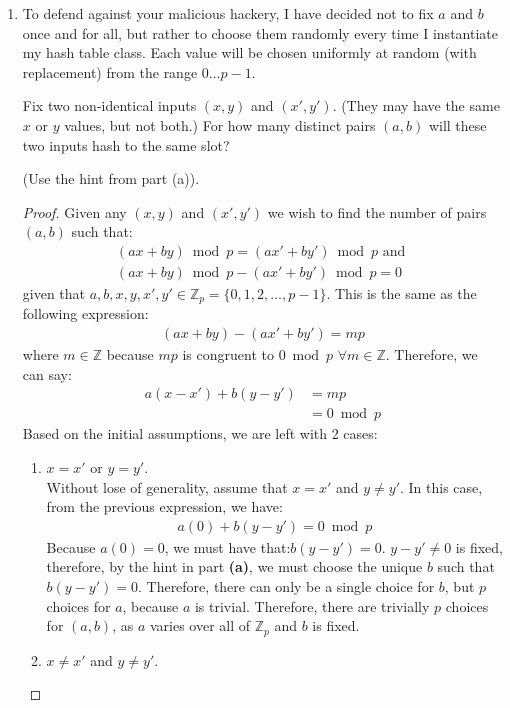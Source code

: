 \documentclass[11pt]{article}
\begin{document}
\begin{enumerate}
\begin{enumerate}
\item To defend against your malicious hackery, I have decided not to fix
$a$ and $b$ once and for all, but rather to choose them randomly every
time I instantiate my hash table class.  Each value will be chosen
uniformly at random (with replacement) from the range $0 \ldots p-1$.

Fix two non-identical inputs $(x,y)$ and $(x',y')$.  (They may have
the same $x$ or $y$ values, but not both.) For how many distinct pairs
$(a,b)$ will these two inputs hash to the same slot?

(Use the hint from part (a)).

\begin{proof}
Given any $(x,y)$ and $(x',y')$ we wish to find the number of pairs $(a,b)$ such that:
\begin{align*}
(ax+by)\bmod p = (ax'+by')\bmod p \text{ and } \\
(ax+by)\bmod p - (ax'+by')\bmod p = 0 
 \end{align*}
 given that $a,b,x,y,x',y' \in \mathbb{Z}_p = \{0,1,2,\ldots,p-1\}$.  This is the same as the following expression:
\begin{align*}
 (ax+by)-(ax'+by') = mp
\end{align*}
where $m \in \mathbb{Z}$ because $mp$ is congruent to $0 \bmod p$ $\forall m \in \mathbb{Z}$.
Therefore, we can say:
\begin{align*}
a(x-x')+b(y-y')  &= mp
\\&=0 \bmod p
\end{align*}  
Based on the initial assumptions, we are left with 2 cases:
\begin{enumerate}
\item $x=x'$ or $y=y'$.
\\
Without lose of generality, assume that $x=x'$ and $y \neq y'$.  In this case, from the previous expression, we have:
\begin{align*}
a(0) + b(y-y')= 0 \bmod p
\end{align*}
Because $a(0) = 0$, we must have that:$
b(y-y') = 0$.  $y-y'\neq 0$ is fixed, therefore, by the hint in part \textbf{(a)}, we must choose the unique $b$ such that $b(y-y')=0$.  Therefore, there can only be a single choice for $b$, but $p$ choices for $a$, because $a$ is trivial.  Therefore, there are trivially $p$ choices for $(a,b)$, as $a$ varies over all of $\mathbb{Z}_p$ and $b$ is fixed.
\\
\item $x \neq x'$ and $y \neq y'$.


\end{enumerate}
\end{proof}
\end{enumerate}
\end{enumerate}
\end{document}
